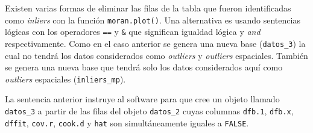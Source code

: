 \documentclass[11pt,b5paper,]{krantz}
\newenvironment{Shaded}{}{}
\newcommand{\DecValTok}[1]{\textcolor[rgb]{0.25,0.63,0.44}{#1}}
\newcommand{\FloatTok}[1]{\textcolor[rgb]{0.25,0.63,0.44}{#1}}
\newcommand{\NormalTok}[1]{#1}
\newcommand{\OperatorTok}[1]{\textcolor[rgb]{0.40,0.40,0.40}{#1}}
\newcommand{\OtherTok}[1]{\textcolor[rgb]{0.00,0.44,0.13}{#1}}
\newcommand{\StringTok}[1]{\textcolor[rgb]{0.25,0.44,0.63}{#1}}
\begin{document}
Existen varias formas de eliminar las filas de la tabla que fueron identificadas como \emph{inliers} con la función \texttt{moran.plot()}. Una alternativa es usando sentencias lógicas con los operadores \texttt{==} y \texttt{\&} que significan igualdad lógica y \emph{and} respectivamente. Como en el caso anterior se genera una nueva base (\texttt{datos\_3}) la cual no tendrá los datos considerados como \emph{outliers} y \emph{outliers} espaciales. También se genera una nueva base que tendrá solo los datos considerados aquí como \emph{outliers} espaciales (\texttt{inliers\_mp}).

\begin{Shaded}
\end{Shaded}

La sentencia anterior instruye al software para que cree un objeto llamado \texttt{datos\_3} a partir de las filas del objeto \texttt{datos\_2} cuyas columnas \texttt{dfb.1}, \texttt{dfb.x}, \texttt{dffit}, \texttt{cov.r}, \texttt{cook.d} y \texttt{hat} son simultáneamente iguales a \texttt{FALSE}.
\end{document}
